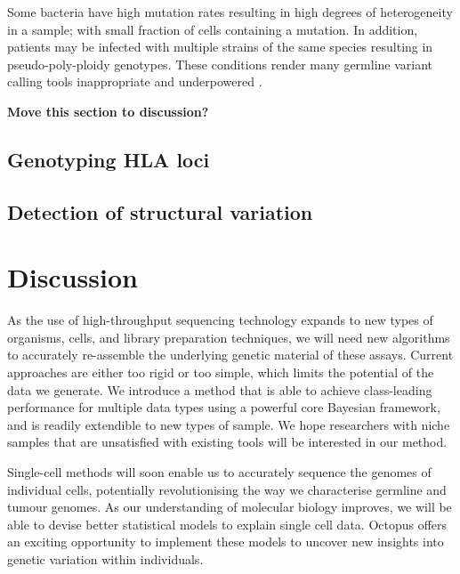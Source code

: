 \documentclass[notitlepage, twocolumn]{article}
\begin{document}
Some bacteria have high mutation rates resulting in high degrees of heterogeneity in a sample; with small fraction of cells containing a mutation. In addition, patients may be infected with multiple strains of the same species resulting in pseudo-poly-ploidy genotypes. These conditions render many germline variant calling tools inappropriate and underpowered \cite{microbial-snp-callling}.

{\bf Move this section to discussion?}

\subsection*{Genotyping HLA loci}

\subsection*{Detection of structural variation}

\section*{Discussion}

As the use of high-throughput sequencing technology expands to new types of organisms, cells, and library preparation techniques, we will need new algorithms to accurately re-assemble the underlying genetic material of these assays. Current approaches are either too rigid or too simple, which limits the potential of the data we generate. We introduce a method that is able to achieve class-leading performance for multiple data types using a powerful core Bayesian framework, and is readily extendible to new types of sample. We hope researchers with niche samples that are unsatisfied with existing tools will be interested in our method.

Single-cell methods will soon enable us to accurately sequence the genomes of individual cells, potentially revolutionising the way we characterise germline and tumour genomes. As our understanding of molecular biology improves, we will be able to devise better statistical models to explain single cell data. Octopus offers an exciting opportunity to implement these models to uncover new insights into genetic variation within individuals.
\end{document}
